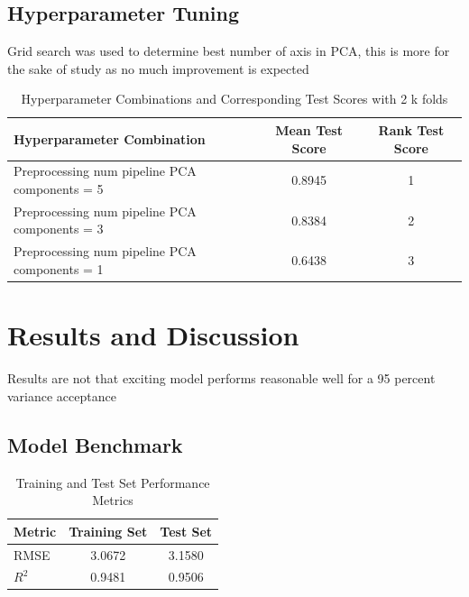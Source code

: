 \documentclass{article}
\begin{document}
\subsection{Hyperparameter Tuning}
Grid search was used to determine best number of axis 
in PCA, this is more for the sake of study as no much improvement is expected
\begin{table}[h!]
    \centering
    \caption{Hyperparameter Combinations and Corresponding Test Scores with 2 k folds}
    \label{tab:hyperparam_scores}
    \begin{tabular}{lcc}
    \toprule
    \textbf{Hyperparameter Combination} & \textbf{Mean Test Score} & \textbf{Rank Test Score} \\
    \midrule
    Preprocessing num pipeline PCA components = 5 & 0.8945 & 1 \\
    Preprocessing num pipeline PCA components = 3 & 0.8384 & 2 \\
    Preprocessing num pipeline PCA components = 1 & 0.6438 & 3 \\
    \bottomrule
    \end{tabular}
    \end{table}


\section{Results and Discussion}

Results are not that exciting model performs reasonable well for a 95 percent variance
acceptance

\subsection{Model Benchmark}
\begin{table}[h!]
    \centering
    \caption{Training and Test Set Performance Metrics}
    \label{tab:performance_metrics}
    \renewcommand{\arraystretch}{1.2} %
    \begin{tabular}{lcc}
        \toprule
        \textbf{Metric} & \textbf{Training Set} & \textbf{Test Set} \\
        \midrule
        RMSE            & 3.0672               & 3.1580           \\
        \( R^2 \)       & 0.9481               & 0.9506           \\
        \bottomrule
    \end{tabular}
\end{table}
\end{document}
